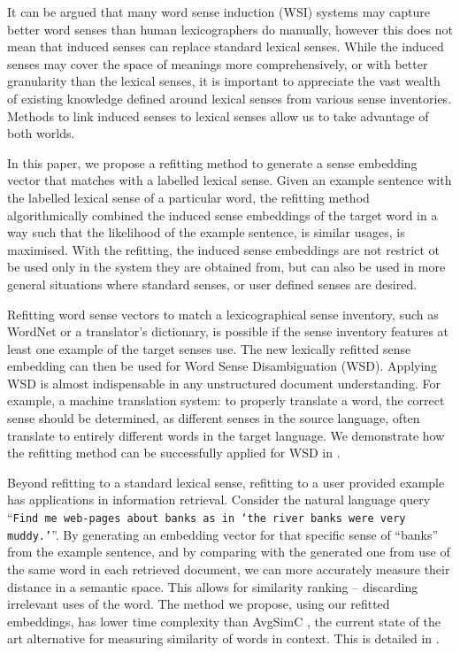 \documentclass{sig-alternate}
\newcommand{\wordquote}[1]{\enquote{\texttt{#1}}}
\begin{document}
It can be argued that many word sense induction (WSI) systems may capture better word senses than human lexicographers do manually, however this does not mean that induced senses can replace standard lexical senses. While the induced senses may cover the space of meanings more comprehensively, or with better granularity than the lexical senses, it is important to appreciate the vast wealth of existing knowledge defined around lexical senses from various sense inventories. Methods to link induced senses to lexical senses allow us to take advantage of both worlds.


In this paper, we propose a refitting method to generate a sense embedding vector that matches with a labelled lexical sense.
Given an example sentence with the labelled lexical sense of a particular word, the refitting method algorithmically combined the induced sense embeddings of the target word in a way such that the likelihood of the example sentence, is similar usages, is maximised.
With the refitting, the induced sense embeddings are not restrict ot be used only in the system they are obtained from, but can also be used in more general situations where standard senses, or user defined senses are desired.


Refitting word sense vectors to match a lexicographical sense inventory, such as WordNet or a translator's dictionary, is possible if the sense inventory features at least one example of the target senses use. The new lexically refitted sense embedding can then be used for Word Sense Disambiguation (WSD). 
Applying WSD is almost indispensable in any unstructured document understanding.
For example, a machine translation system: to properly translate a word, the correct sense should be determined, as different senses in the source language, often translate to entirely different words in the target language.
We demonstrate how the refitting method can be successfully applied for WSD in .

Beyond refitting to a standard lexical sense, refitting to a user provided example has applications in information retrieval. Consider the natural language query \wordquote{Find me web-pages about banks as in \enquote{the river banks were very muddy.}}. By generating an embedding vector for that specific sense of ``banks'' from the example sentence, and by comparing with the generated one from use of the same word in each retrieved document, we can more accurately measure their distance in a semantic space. This allows for similarity ranking -- discarding irrelevant uses of the word. The method we propose, using our refitted embeddings, has lower time complexity than AvgSimC \parencite{Reisinger2010}, the current state of the art alternative for measuring similarity of words in context. This is detailed in .
\end{document}
